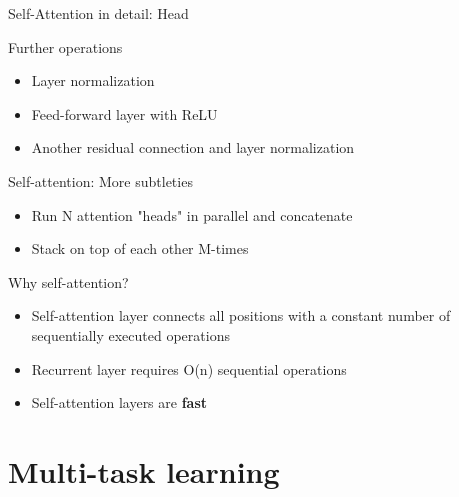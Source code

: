 \documentclass[12pt,aspectratio=169,handout]{beamer}
\begin{document}
\begin{frame}{Self-Attention in detail: Head}
	
	
	\begin{figure}
		\scalebox{0.75}{\hspace{-1.5cm}
			
		}
	\end{figure}
	
	Further operations
	
	\begin{itemize}
		\item Layer normalization
		\item Feed-forward layer with ReLU
		\item Another residual connection and layer normalization
	\end{itemize}
	
\end{frame}


\begin{frame}{Self-attention: More subtleties}
	
	\begin{itemize}
		\item Run N attention "heads" in parallel and concatenate
		\item Stack on top of each other M-times
	\end{itemize}
	
	
	Why self-attention?
	
	\begin{itemize}
		\item Self-attention layer connects all positions with a constant number of sequentially executed operations
		\item Recurrent layer requires O(n) sequential operations
		\item Self-attention layers are \textbf{fast}
	\end{itemize}
	
	\begin{footnotesize}
	\end{footnotesize}
	
	
\end{frame}


\section{Multi-task learning}
\end{document}
